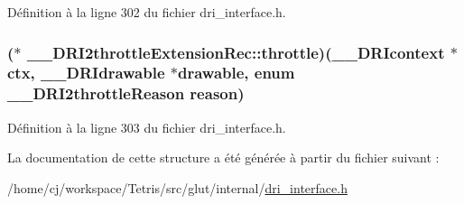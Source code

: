 Définition à la ligne 302 du fichier dri\-\_\-interface.\-h.

\hypertarget{struct_____d_r_i2throttle_extension_rec_a831ccfd6396ecba525b6f0b4c1995b8d}{
\subsubsection[{throttle}]{($\ast$ \-\_\-\-\_\-\-D\-R\-I2throttle\-Extension\-Rec\-::throttle)({\bf \-\_\-\-\_\-\-D\-R\-Icontext} $\ast$ctx, {\bf \-\_\-\-\_\-\-D\-R\-Idrawable} $\ast$drawable, enum {\bf \-\_\-\-\_\-\-D\-R\-I2throttle\-Reason} reason)}}\label{struct_____d_r_i2throttle_extension_rec_a831ccfd6396ecba525b6f0b4c1995b8d}


Définition à la ligne 303 du fichier dri\-\_\-interface.\-h.



La documentation de cette structure a été générée à partir du fichier suivant \-:\begin{DoxyCompactItemize}
\item 
/home/cj/workspace/\-Tetris/src/glut/internal/\hyperlink{dri__interface_8h}{dri\-\_\-interface.\-h}\end{DoxyCompactItemize}
